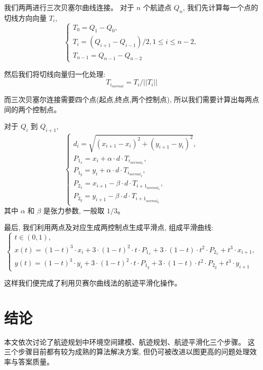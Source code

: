 \documentclass[12pt,a4paper,oneside,UTF8]{ctexart}
\begin{document}
我们两两进行三次贝塞尔曲线连接。
对于 $n$ 个航迹点 $Q_n$,
我们先计算每一个点的切线方向向量 $T_i$,
\begin{equation}
  \begin{cases}
    T_0 = Q_1 - Q_0 ,\\
    T_i = (Q_{i+1}-Q_{i-1})/2 , 1 \leq i \leq n-2 ,\\
    T_{n-1} = Q_{n-1} - Q_{n-2}
  \end{cases}
  \nonumber
\end{equation}

然后我们将切线向量归一化处理:
\[ T_{i_{normal}} = T_i / \lvert {\lvert T_i \rvert}\rvert \]

而三次贝塞尔连接需要四个点(起点,终点,两个控制点),
所以我们需要计算出每两点间的两个控制点。

对于 $Q_i$ 到 $Q_{i+1}$,
\begin{equation}
  \begin{cases}
    d_i=\sqrt{(x_{i+1}-x_i)^2 + (y_{i+1}-y_i)^2} ,\\
    P_{1_x} = x_i + \alpha \cdot d\cdot T_{i_{{normal}_x}} ,\\
    P_{1_y} = y_i + \alpha \cdot d\cdot T_{i_{{normal}_y}} ,\\
    P_{2_x} = x_{i+1} - \beta \cdot d\cdot T_{{i+1}_{{normal}_x}} ,\\
    P_{2_y} = y_{i+1} - \beta \cdot d\cdot T_{{i+1}_{{normal}_y}}
  \end{cases}
  \nonumber
\end{equation}
其中 $\alpha$ 和 $\beta$ 是张力参数,
一般取 $1/3$。

最后,
我们利用两点及对应生成两控制点生成平滑点,
组成平滑曲线:
\begin{equation}
  \begin{cases}
    t \in (0,1) ,\\
    x(t) = (1-t)^3\cdot x_i + 3\cdot (1-t)^2\cdot t\cdot P_{1_x} + 3\cdot(1-t)\cdot t^2\cdot P_{2_x}+t^3\cdot x_{i+1} ,\\
    y(t) = (1-t)^3\cdot y_i + 3\cdot (1-t)^2\cdot t\cdot P_{1_y} + 3\cdot(1-t)\cdot t^2\cdot P_{2_y}+t^3\cdot y_{i+1}
  \end{cases}
  \nonumber
\end{equation}

这样我们便完成了利用贝赛尔曲线法的航迹平滑化操作。
\newpage\section{结论}
本文依次讨论了航迹规划中环境空间建模、航迹规划、航迹平滑化三个步骤。
这三个步骤目前都有较为成熟的算法解决方案,
但仍可被改进以图更高的问题处理效率与答案质量。
\end{document}
